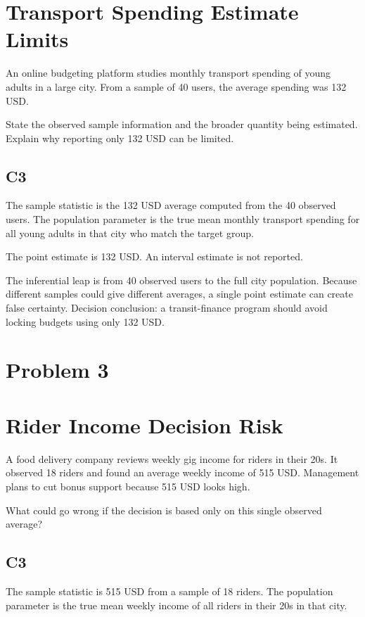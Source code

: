 \begin{ExamProblems}
		\section{Transport Spending Estimate Limits}
		An online budgeting platform studies monthly transport spending of young adults in a large city.
		From a sample of 40 users, the average spending was 132 USD.

		State the observed sample information and the broader quantity being estimated.
		Explain why reporting only 132 USD can be limited.

		\subsection*{C3}
		The sample statistic is the 132 USD average computed from the 40 observed users.
		The population parameter is the true mean monthly transport spending for all young adults in that city who match the target group.

		The point estimate is 132 USD.
		An interval estimate is not reported.

		The inferential leap is from 40 observed users to the full city population.
		Because different samples could give different averages, a single point estimate can create false certainty.
		Decision conclusion: a transit-finance program should avoid locking budgets using only 132 USD.

		\newpage
		\item
		\section{Problem 3}
		\section{Rider Income Decision Risk}
		A food delivery company reviews weekly gig income for riders in their 20s.
		It observed 18 riders and found an average weekly income of 515 USD.
		Management plans to cut bonus support because 515 USD looks high.

		What could go wrong if the decision is based only on this single observed average?

		\subsection*{C3}
		The sample statistic is 515 USD from a sample of 18 riders.
		The population parameter is the true mean weekly income of all riders in their 20s in that city.


\end{ExamProblems}
